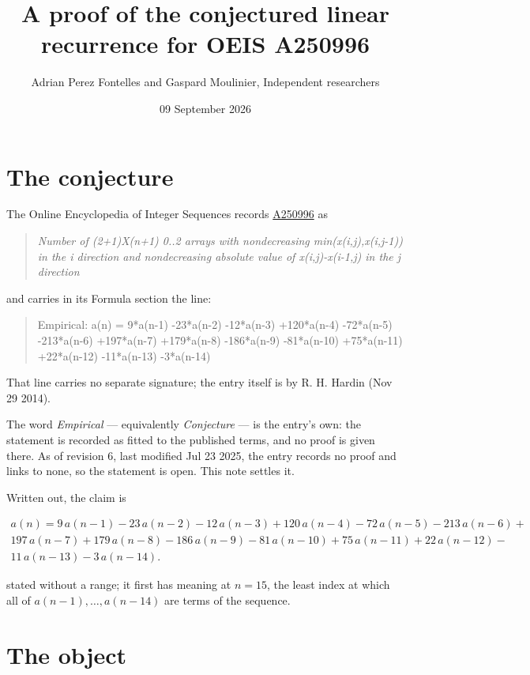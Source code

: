 \documentclass[11pt]{article}
\title{A proof of the conjectured linear recurrence for OEIS A250996}
\author{Adrian Perez Fontelles and Gaspard Moulinier, Independent researchers}
\date{09 September 2026}
\theoremstyle{definition}
\begin{document}
\maketitle
\section{The conjecture}

The Online Encyclopedia of Integer Sequences records \href{https://oeis.org/A250996}{A250996} as

\begin{quote}\itshape Number of (2+1)X(n+1) 0..2 arrays with nondecreasing min(x(i,j),x(i,j-1)) in the i direction and nondecreasing absolute value of x(i,j)-x(i-1,j) in the j direction\end{quote}

and carries in its Formula section the line:

\begin{quote}\ttfamily Empirical: a(n) = 9*a(n-1) -23*a(n-2) -12*a(n-3) +120*a(n-4) -72*a(n-5) -213*a(n-6) +197*a(n-7) +179*a(n-8) -186*a(n-9) -81*a(n-10) +75*a(n-11) +22*a(n-12) -11*a(n-13) -3*a(n-14)\end{quote}

That line carries no separate signature; the entry itself is by R. H. Hardin (Nov 29 2014).

The word {\itshape Empirical} --- equivalently {\itshape Conjecture} --- is the entry's own: the statement is recorded as fitted to the published terms, and no proof is given there. As of revision 6, last modified Jul 23 2025, the entry records no proof and links to none, so the statement is open. This note settles it.

Written out, the claim is

\begin{multline*} a(n) = 9\,a(n-1) - 23\,a(n-2) - 12\,a(n-3) + 120\,a(n-4) - 72\,a(n-5) - 213\,a(n-6) + \\ 197\,a(n-7) + 179\,a(n-8) - 186\,a(n-9) - 81\,a(n-10) + 75\,a(n-11) + 22\,a(n-12) - \\ 11\,a(n-13) - 3\,a(n-14). \end{multline*}

stated without a range; it first has meaning at $n = 15$, the least index at which all of $a(n-1),\dots,a(n-14)$ are terms of the sequence.

\section{The object}
\end{document}

